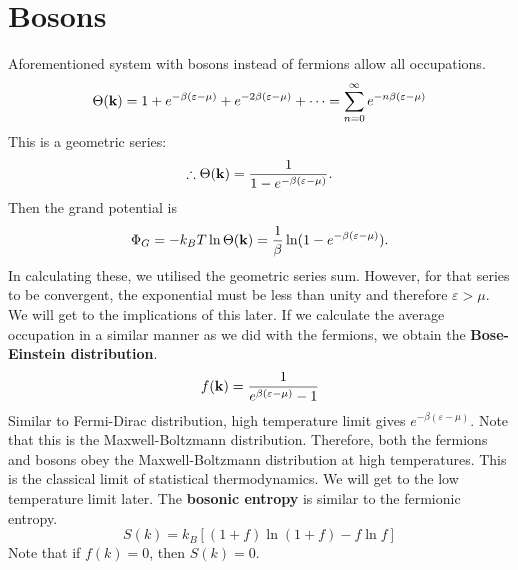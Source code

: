     \section{Bosons}
        Aforementioned system with bosons instead of fermions allow all occupations. 
        \begin{equation}
            \Theta(\mathbf{k}) = 1+e^{-\beta(\varepsilon-\mu)}+e^{-2\beta(\varepsilon-\mu)}+\dots = \sum_{n=0}^{\infty}e^{-n\beta(\varepsilon-\mu)}
        \end{equation}    
        This is a geometric series:
        \begin{equation}
            \therefore \Theta(\mathbf{k}) = \frac{1}{1-e^{-\beta(\varepsilon-\mu)}}.
        \end{equation}
        Then the grand potential is
        \begin{equation}
            \Phi_G = -k_BT\ln\Theta(\mathbf{k}) = \frac{1}{\beta}\ln(1-e^{-\beta(\varepsilon-\mu)}).
        \end{equation}
        In calculating these, we utilised the geometric series sum. However, for that series to be convergent, the exponential must be less than unity and therefore $\varepsilon>\mu$. We will get to the implications of this later. If we calculate the average occupation in a similar manner as we did with the fermions, we obtain the \textbf{Bose-Einstein distribution}.
        \begin{equation}
            f(\mathbf{k})=\frac{1}{e^{\beta(\varepsilon-\mu)}-1}
        \end{equation}
        Similar to Fermi-Dirac distribution, high temperature limit gives $e^{-\beta(\varepsilon-\mu)}$. Note that this is the Maxwell-Boltzmann distribution. Therefore, both the fermions and bosons obey the Maxwell-Boltzmann distribution at high temperatures. This is the classical limit of statistical thermodynamics. We will get to the low temperature limit later. The \textbf{bosonic entropy} is similar to the fermionic entropy.
        \begin{equation}
            S(k) = k_B[(1+f)\ln(1+f)-f\ln f]
        \end{equation}
        Note that if $f(k)=0$, then $S(k)=0$.

